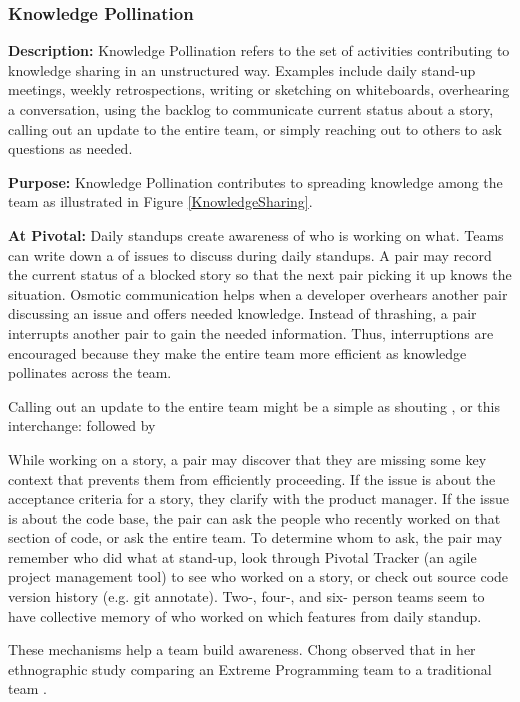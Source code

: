 \subsubsection{Knowledge Pollination}
\textbf{Description:} Knowledge Pollination refers to the set of activities contributing to knowledge sharing in an unstructured way. Examples include daily stand-up meetings, weekly retrospections, writing or sketching on whiteboards, overhearing a conversation, using the backlog to communicate current status about a story, calling out an update to the entire team, or simply reaching out to others to ask questions as needed. 

\textbf{Purpose:} Knowledge Pollination contributes to spreading knowledge among the team as illustrated in Figure \ref{KnowledgeSharing}.

\textbf{At Pivotal:} Daily standups create awareness of who is working on what. Teams can write down a  of issues to discuss during daily standups. A pair may record the current status of a blocked story so that the next pair picking it up knows the situation. Osmotic communication helps when a developer overhears another pair discussing an issue and offers needed knowledge. Instead of thrashing, a pair interrupts another pair to gain the needed information. Thus, interruptions are encouraged because they make the entire team more efficient as knowledge pollinates across the team. 

Calling out an update to the entire team might be a simple as shouting , or this interchange:  followed by 

While working on a story, a pair may discover that they are missing some key context that prevents them from efficiently proceeding. If the issue is about the acceptance criteria for a story, they clarify with the product manager. If the issue is about the code base, the pair can ask the people who recently worked on that section of code, or ask the entire team. To determine whom to ask, the pair may remember who did what at stand-up, look through Pivotal Tracker (an agile project management tool) to see who worked on a story, or check out source code version history (e.g. git annotate). Two-, four-, and six- person teams seem to have collective memory of who worked on which features from daily standup. 

These mechanisms help a team build awareness. Chong observed that  in her ethnographic study comparing an Extreme Programming team to a traditional team \cite{ChongNominum}.
 
